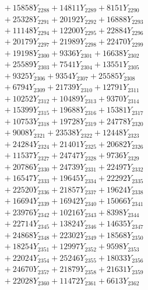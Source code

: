 \documentclass[a4paper,10pt]{article}
\begin{document}
{\begin{align}
&\;  + 15858 Y_{2288} + 14811 Y_{2289} + 8151 Y_{2290} \\[0.3ex]
&\;  + 25328 Y_{2291} + 20192 Y_{2292} + 16888 Y_{2293} \\[0.3ex]
&\;  + 11148 Y_{2294} + 12200 Y_{2295} + 22884 Y_{2296} \\[0.3ex]
&\;  + 20179 Y_{2297} + 21989 Y_{2298} + 22470 Y_{2299} \\[0.3ex]
&\;  + 19198 Y_{2300} + 9336 Y_{2301} + 16638 Y_{2302} \\[0.3ex]
&\;  + 25589 Y_{2303} + 7541 Y_{2304} + 13551 Y_{2305} \\[0.3ex]
&\;  + 9325 Y_{2306} + 9354 Y_{2307} + 25585 Y_{2308} \\[0.5ex]\allowbreak
&\;  + 6794 Y_{2309} + 21739 Y_{2310} + 12791 Y_{2311} \\[0.3ex]
&\;  + 10252 Y_{2312} + 10489 Y_{2313} + 9370 Y_{2314} \\[0.3ex]
&\;  + 15399 Y_{2315} + 19688 Y_{2316} + 15381 Y_{2317} \\[0.3ex]
&\;  + 10753 Y_{2318} + 19728 Y_{2319} + 24778 Y_{2320} \\[0.3ex]
&\;  + 9008 Y_{2321} + 23538 Y_{2322} + 12448 Y_{2323} \\[0.3ex]
&\;  + 24284 Y_{2324} + 21401 Y_{2325} + 20682 Y_{2326} \\[0.3ex]
&\;  + 11537 Y_{2327} + 24747 Y_{2328} + 9736 Y_{2329} \\[0.3ex]
&\;  + 20786 Y_{2330} + 24739 Y_{2331} + 22497 Y_{2332} \\[0.3ex]
&\;  + 16547 Y_{2333} + 19645 Y_{2334} + 22292 Y_{2335} \\[0.3ex]
&\;  + 22520 Y_{2336} + 21857 Y_{2337} + 19624 Y_{2338} \\[0.5ex]\allowbreak
&\;  + 16694 Y_{2339} + 16942 Y_{2340} + 15066 Y_{2341} \\[0.3ex]
&\;  + 23976 Y_{2342} + 10216 Y_{2343} + 8398 Y_{2344} \\[0.3ex]
&\;  + 22714 Y_{2345} + 13824 Y_{2346} + 14635 Y_{2347} \\[0.3ex]
&\;  + 24868 Y_{2348} + 22302 Y_{2349} + 18568 Y_{2350} \\[0.3ex]
&\;  + 18254 Y_{2351} + 12997 Y_{2352} + 9598 Y_{2353} \\[0.3ex]
&\;  + 22024 Y_{2354} + 25246 Y_{2355} + 18033 Y_{2356} \\[0.3ex]
&\;  + 24670 Y_{2357} + 21879 Y_{2358} + 21631 Y_{2359} \\[0.3ex]
&\;  + 22028 Y_{2360} + 11472 Y_{2361} + 6613 Y_{2362} \\[0.3ex]

\end{align}}
\end{document}
